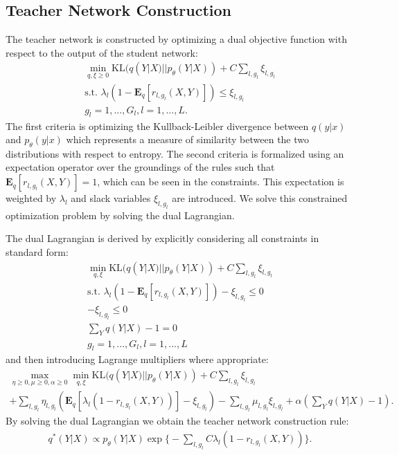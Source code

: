 \documentclass[11pt]{article}
\begin{document}
\subsection{Teacher Network Construction}
The teacher network is constructed by optimizing a dual objective function with respect to the output of the student network:
\begin{equation}
\begin{gathered}
\min_{q, \xi \geq 0}  \text{KL}(q(Y|X) || p_\theta(Y|X)) + C \sum_{l, g_l} \xi_{l, g_l}\\
\text{s.t. } \lambda_l (1 - \mathbf{E}_q[r_{l,g_l}(X, Y)]) \leq \xi_{l, g_l}\\
g_l = 1,...,G_l, l= 1,..., L.
\end{gathered}
\end{equation}
The first criteria is optimizing the Kullback-Leibler divergence between $q(y|x)$ and $p_\theta(y|x)$ which represents a measure of similarity between the two distributions with respect to entropy.  The second criteria is formalized using an expectation operator over the groundings of the rules such that $\mathbf{E}_q[r_{l,g_l}(X, Y)] = 1$, which can be seen in the constraints.  This expectation is weighted by $\lambda_l$ and slack variables $\xi_{l, g_l}$ are introduced.  We solve this constrained optimization problem by solving the dual Lagrangian.

The dual Lagrangian is derived by explicitly considering all constraints in standard form:
\begin{gather*}
\min_{q, \xi} \text{KL}(q(Y|X) || p_\theta(Y|X)) + C \sum_{l, g_l} \xi_{l, g_l}\\
\text{s.t. } \lambda_l (1 - \mathbf{E}_q[r_{l,g_l}(X, Y)]) - \xi_{l, g_l}\leq 0\\
-\xi_{l, g_l} \leq 0\\
\sum_Y q(Y|X) - 1 = 0\\
g_l = 1,...,G_l, l= 1,..., L
\end{gather*}
and then introducing Lagrange multipliers where appropriate:
\begin{gather*}
\max_{\eta \geq 0, \mu \geq 0, \alpha \geq 0} \min_{q, \xi}  \text{KL}(q(Y|X) || p_\theta(Y|X)) + C \sum_{l, g_l}  \xi_{l, g_l} \\
+ \sum_{l, g_l} \eta_{l, g_l}(\mathbf{E}_q[\lambda_l (1 - r_{l, g_l}(X, Y))] - \xi_{l, g_l}) - \sum_{l, g_l} \mu_{l, g_l}   \xi_{l, g_l} + \alpha(\sum_Y q(Y|X) - 1).
\end{gather*}
By solving the dual Lagrangian we obtain the teacher network construction rule:
\begin{gather}
q^*(Y|X) \propto p_\theta(Y|X) \exp\bigg \{ -\sum_{l,g_l}C \lambda_l (1 - r_{l,g_l}(X, Y)) \bigg \}.
\end{gather}
\end{document}
